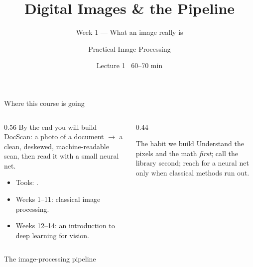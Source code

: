 \documentclass[10pt,aspectratio=169]{beamer}
\title{Digital Images \& the Pipeline}
\subtitle{Week 1 — What an image really is}
\author{Practical Image Processing}
\date{Lecture 1 \textbullet\ 60--70 min}
\begin{document}
\maketitle

\begin{frame}{Where this course is going}
  \begin{columns}[T]
    \begin{column}{0.56\textwidth}
      By the end you will build \alert{DocScan}: a photo of a document $\rightarrow$ a clean,
      deskewed, machine-readable scan, then read it with a small neural net.
      \begin{itemize}
        \item Tools: .
        \item Weeks 1--11: classical image processing.
        \item Weeks 12--14: an introduction to deep learning for vision.
      \end{itemize}
    \end{column}
    \begin{column}{0.44\textwidth}
      \begin{alertblock}{The habit we build}
        Understand the pixels and the math \emph{first}; call the library second; reach for a
        neural net only when classical methods run out.
      \end{alertblock}
    \end{column}
  \end{columns}
\end{frame}

\begin{frame}{The image-processing pipeline}
  \begin{center}
  \end{center}
\end{frame}
\end{document}
